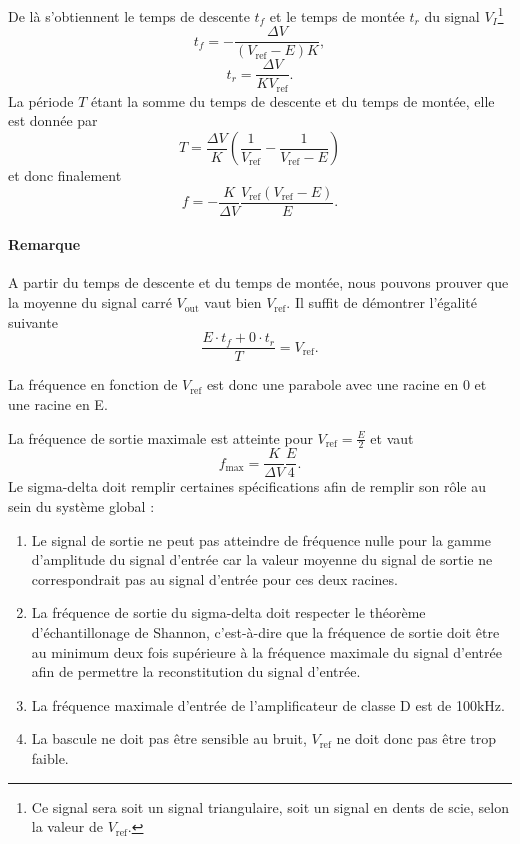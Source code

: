 De là s'obtiennent le temps de descente $t_f$ et le temps de montée $t_r$
du signal $V_I$\footnote{Ce signal sera soit un signal triangulaire,
soit un signal en dents de scie, selon la valeur de $V_{\text{ref}}$.}
\[ t_f = -\frac{\Delta V}{(V_{\text{ref}} - E)K},\]
\[ t_r = \frac{\Delta V}{KV_{\text{ref}}}.\]
La période $T$ étant la somme du temps de descente et du temps
de montée, elle est donnée par
\[ T = \frac{\Delta V}{K}\left(\frac{1}{V_{\text{ref}}} - \frac{1}{V_{\text{ref}} - E}\right) \]
et donc finalement
\begin{equation} 
	f = -\frac{K}{\Delta V} \frac{V_{\text{ref}}(V_{\text{ref}}-E)}{E}.
	\label{eq:sigma-delta-frequency}
\end{equation}

\paragraph{Remarque}
A partir du temps de descente et du temps de montée, nous
pouvons prouver que la moyenne du signal carré $V_{\text{out}}$
vaut bien $V_{\text{ref}}$. Il suffit de démontrer l'égalité
suivante
\[ \frac{E \cdot t_f + 0 \cdot t_r}{T} = V_{\text{ref}}.\]

La fréquence en fonction de $V_{\text{ref}}$ est donc
une parabole avec une racine en \unit{0}{\volt} et une
racine en \unit{E}{\volt}.

La fréquence de sortie maximale est atteinte pour 
$V_{\text{ref}} = \frac{E}{2}$ et vaut
\[ f_{\text{max}} = \frac{K}{\Delta V}\frac{E}{4}. \]
Le sigma-delta doit remplir certaines spécifications afin de remplir son rôle au sein du système global : \begin{enumerate}
\item Le signal de sortie ne peut pas atteindre de fréquence nulle pour la gamme d'amplitude du signal d'entrée car la valeur moyenne du signal de sortie ne correspondrait pas au signal d'entrée pour ces deux racines.
\item La fréquence de sortie du sigma-delta doit respecter le théorème d'échantillonage de Shannon, c'est-à-dire que la fréquence de sortie doit être au minimum deux fois supérieure à la fréquence maximale du signal d'entrée afin de permettre la reconstitution du signal d'entrée.
\item La fréquence maximale d'entrée de l'amplificateur de classe D est de 100kHz.
\item La bascule ne doit pas être sensible au bruit, $V_{\text{ref}}$ ne doit donc pas être trop faible.
\end{enumerate}

